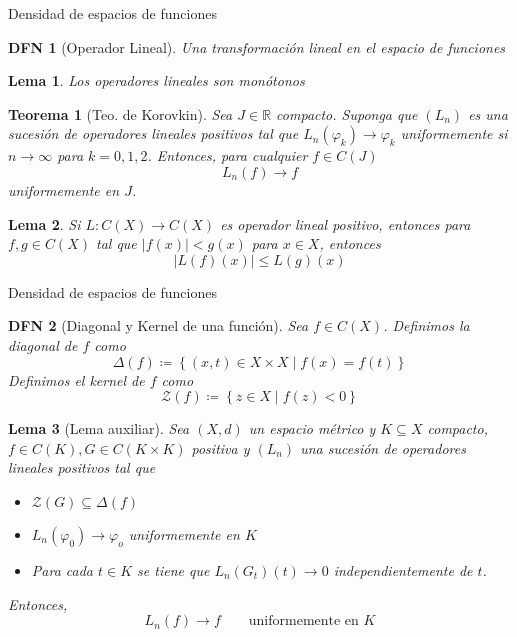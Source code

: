 \documentclass[a4paper]{article}\usepackage{/home/alonso/Documents/Projects/formularios/styles}
\newtheorem{definition}{DFN}
\theoremstyle{mytheoremstyle}
\newtheorem{theorem}{Teorema}
\newtheorem{lemma}{Lema}
\newcommand{\R}{\mathbb{R}}
\newcommand{\1}{\mathds{1}}
\begin{document}
\begin{multicols*}{3}
\begin{roundbox}{Densidad de espacios de funciones}
\begin{definition}[Operador Lineal]
    Una transformación lineal en el espacio de funciones
\end{definition}

\begin{lemma}
    Los operadores lineales son monótonos
\end{lemma}

\begin{theorem}[Teo. de Korovkin]
    Sea $J \in \R$ compacto. Suponga que $(L_n)$ es una sucesión de operadores lineales positivos tal que $L_n(\varphi_k) \to \varphi_k$ uniformemente si $n \to \infty$ para $k=0,1,2$.
    Entonces, para cualquier $f \in C(J)$
    \[
        L_n(f) \to f
    \]
    uniformemente en $J$.
\end{theorem}

\begin{lemma}
    Si $L:C(X) \to C(X)$ es operador lineal positivo, entonces para $f,g \in C(X)$ tal que $|f(x)| < g(x)$ para $x\in X$, entonces
    \[
        |L(f)(x)| \leq L(g)(x)
    \]
\end{lemma}
\end{roundbox}

\begin{roundbox}{Densidad de espacios de funciones}
\begin{definition}[Diagonal y Kernel de una función]
    Sea $f \in C(X)$.
    Definimos la diagonal de $f$ como
    \[
        \Delta(f) \coloneqq \left\{ (x,t) \in X \times X \mid f(x) = f(t) \right\}
    \]
    Definimos el kernel de $f$ como
    \[
        \mathcal{Z}(f) \coloneqq \left\{ z \in X \mid f(z) < 0 \right\}
    \]
\end{definition}

\begin{lemma}[Lema auxiliar]
    Sea $(X,d)$ un espacio métrico y $K \subseteq X$ compacto, $f \in C(K), G \in C(K \times K)$ positiva y $(L_n)$ una sucesión de operadores lineales positivos tal que
    \begin{itemize}
        \item $\mathcal{Z}(G) \subseteq \Delta(f)$
        \item $L_n(\varphi_0) \to \varphi_o$ uniformemente en $K$
        \item Para cada $t \in K$ se tiene que $L_n(G_t)(t) \to 0$ independientemente de $t$.
    \end{itemize}
    Entonces,
    \[
        L_n(f) \to f  \qquad \text{uniformemente en } K
    \]
\end{lemma}
\end{roundbox}


\end{multicols*}
\end{document}
